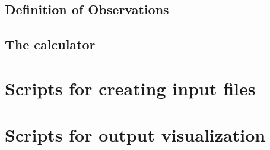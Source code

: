 \documentclass[11pt]{article}
\begin{document}

\subsection{Definition of Observations}


\subsection{The calculator}

\section{Scripts for creating input files}

\section{Scripts for output visualization}
\end{document}
